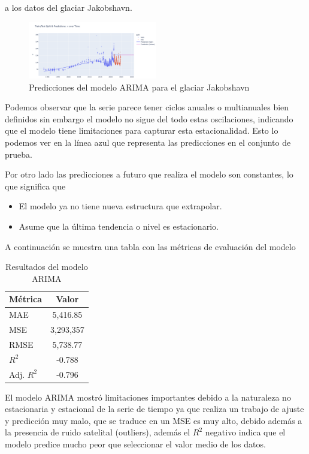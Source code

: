\documentclass[sigconf,language=spanish]{acmart}
\begin{document}
a los datos del glaciar Jakobshavn.

\begin{figure}[H]
    \centering
    \includegraphics[width=0.5\textwidth]{ARIMA1.png} %
    \caption{Predicciones del modelo ARIMA para el glaciar Jakobshavn}
    \label{fig:ARIMA1}
\end{figure}

Podemos observar que la serie parece tener ciclos anuales o multianuales bien definidos sin embargo el modelo
no sigue del todo estas oscilaciones, indicando que el modelo tiene limitaciones para capturar esta estacionalidad. 
Esto lo podemos ver en la línea azul que representa las predicciones en el conjunto de prueba.

Por otro lado las predicciones a futuro que realiza el modelo son constantes, lo que significa que 

\begin{itemize}
  \item El modelo ya no tiene nueva estructura que extrapolar.
  \item Asume que la última tendencia o nivel es estacionario.
\end{itemize}

A continuación se muestra una tabla con las métricas de evaluación del modelo

\begin{table}[H]
  \caption{Resultados del modelo ARIMA}
  \label{tab:ARIMA}
  \begin{tabular}{lc}
    \toprule
    Métrica & Valor \\
    \midrule
    MAE & 5,416.85 \\
    MSE & 3,293,357 \\
    RMSE & 5,738.77 \\
    $R^2$ & -0.788 \\
    Adj. $R^2$ & -0.796 \\
    \bottomrule
  \end{tabular}
\end{table}

El modelo ARIMA mostró limitaciones importantes debido a la naturaleza no estacionaria y estacional de la serie de tiempo
ya que realiza un trabajo de ajuste y predicción muy malo, que se traduce en un MSE es muy alto, debido además a la presencia de ruido satelital (outliers),
además el $R^{2}$ negativo indica que  el modelo predice mucho peor que seleccionar el valor medio de los datos.
\end{document}
